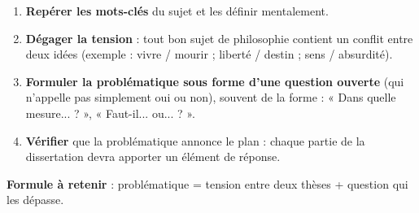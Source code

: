 \documentclass[11pt]{article}
\begin{document}
\begin{methode}
\begin{enumerate}
\item \textbf{Repérer les mots-clés} du sujet et les définir mentalement.
\item \textbf{Dégager la tension} : tout bon sujet de philosophie contient un conflit entre deux idées (exemple : vivre / mourir ; liberté / destin ; sens / absurdité).
\item \textbf{Formuler la problématique sous forme d'une question ouverte} (qui n'appelle pas simplement oui ou non), souvent de la forme : « Dans quelle mesure... ? », « Faut-il... ou... ? ».
\item \textbf{Vérifier} que la problématique annonce le plan : chaque partie de la dissertation devra apporter un élément de réponse.
\end{enumerate}
\textbf{Formule à retenir} : problématique = tension entre deux thèses + question qui les dépasse.
\end{methode}
\end{document}
